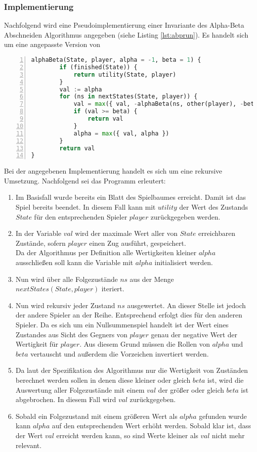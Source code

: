 \subsubsection{Implementierung}
\label{ab-basics-impl}
Nachfolgend wird eine Pseudoimplementierung einer Invariante des Alpha-Beta Abschneiden Algorithmus angegeben (siehe Listing \ref{lst:abprun}). Es handelt sich um eine angepasste Version von \cite{StroetmannAI19}
\begin{lstlisting}[caption = {Pseudoimplementierung von Alpha-Beta Abschneiden}, language = python, captionpos = t , numbers=left, label={lst:abprun}]
alphaBeta(State, player, alpha = -1, beta = 1) {
        if (finished(State)) {
            return utility(State, player)
        }
        val := alpha
        for (ns in nextStates(State, player)) {
            val = max({ val, -alphaBeta(ns, other(player), -beta, -alpha) })
            if (val >= beta) {
                return val
            }
            alpha = max({ val, alpha })
        }
        return val
}
\end{lstlisting}
Bei der angegebenen Implementierung handelt es sich um eine rekursive Umsetzung. Nachfolgend sei das Programm erleutert:
\begin{enumerate}
\item Im Basisfall wurde bereits ein Blatt des Spielbaumes erreicht. Damit ist das Spiel bereits beendet. In diesem Fall kann mit $utility$ der Wert des Zustands $State$ für den entsprechenden Spieler $player$ zurückgegeben werden.
\item In der Variable $val$ wird der maximale Wert aller von $State$ erreichbaren Zustände, sofern $player$ einen Zug ausführt, gespeichert.\\
Da der Algorithmus per Definition alle Wertigkeiten kleiner $alpha$ ausschließen soll kann die Variable mit $alpha$ initialisiert werden.
\item Nun wird über alle Folgezustände $ns$ aus der Menge $nextStates(State, player)$ iteriert.
\item Nun wird rekursiv jeder Zustand $ns$ ausgewertet. An dieser Stelle ist jedoch der andere Spieler an der Reihe. Entsprechend erfolgt dies für den anderen Spieler. Da es sich um ein Nullsummenspiel handelt ist der Wert eines Zustandes aus Sicht des Gegners von $player$ genau der negative Wert der Wertigkeit für $player$. Aus diesem Grund müssen die Rollen von $alpha$ und $beta$ vertauscht und außerdem die Vorzeichen invertiert werden.
\item Da laut der Spezifikation des Algorithmus nur die Wertigkeit von Zuständen berechnet werden sollen in denen diese kleiner oder gleich $beta$ ist, wird die Auswertung aller Folgezustände mit einem $val$ der größer oder gleich $beta$ ist abgebrochen. In diesem Fall wird $val$ zurückgegeben.
\item Sobald ein Folgezustand mit einem größeren Wert als $alpha$ gefunden wurde kann $alpha$ auf den entsprechenden Wert erhöht werden. Sobald klar ist, dass der Wert $val$ erreicht werden kann, so sind Werte kleiner als $val$ nicht mehr relevant.  
 
\end{enumerate}

